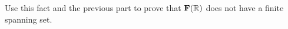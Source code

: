 \begin{prob}
\begin{enumerate}[a)]
Use this fact and the previous part to prove that $\mathbf{F}(\mathbb{R})$ does not have a finite spanning set.
\medskip
%
\end{enumerate}


\end{prob}
